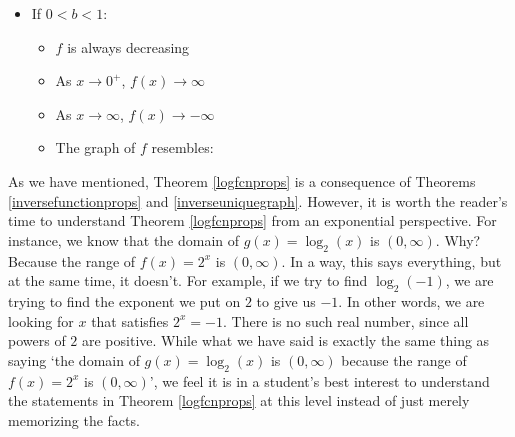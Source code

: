 \begin{minipage}{\specialboxlength}
{\begin{multicols}{2}
\begin{itemize}
\item  If $0<b<1$:

\begin{itemize}

\item  $f$ is always decreasing

\item  As $x \rightarrow 0^{+}$, $f(x) \rightarrow \infty$

\item  As $x \rightarrow \infty$, $f(x) \rightarrow -\infty$

\item  The graph of $f$ resembles:

\end{itemize}
\begin{center}
\end{center}
\end{itemize} 

\end{multicols}
}
\end{minipage}
\restoreboxwidth

\smallskip

As we have mentioned, Theorem \ref{logfcnprops} is a consequence of Theorems \ref{inversefunctionprops} and \ref{inverseuniquegraph}.  However, it is worth the reader's time to understand Theorem \ref{logfcnprops} from an exponential perspective.  For instance, we know that the domain of $g(x) = \log_{2}(x)$ is $(0,\infty)$.  Why?  Because the range of $f(x) = 2^{x}$ is $(0,\infty)$.  In a way, this says everything, but at the same time, it doesn't. For example, if we try to find $\log_{2}(-1)$, we are trying to find the exponent we put on $2$ to give us $-1$.  In other words, we are looking for $x$ that satisfies $2^{x} = -1$.  There is no such real number, since all powers of $2$ are positive.  While what we have said is exactly the same thing as saying `the domain of $g(x) = \log_{2}(x)$ is $(0,\infty)$ because the range of $f(x) = 2^{x}$ is $(0,\infty)$', we feel it is in a student's best interest to understand the statements in Theorem \ref{logfcnprops} at this level instead of just merely memorizing the facts.

\medskip

